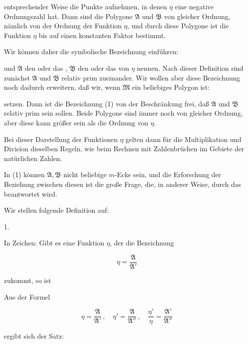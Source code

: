 entsprechender Weise die Punkte aufnehmen, in denen $\eta$ eine negative Ordnungszahl hat. Dann sind die Polygone $\mathfrak{A}$ und $\mathfrak{B}$ von gleicher Ordnung, nämlich von der Ordnung der Funktion $\eta$, und durch diese Polygone ist die Funktion $\eta$ bis auf einen konstanten Faktor bestimmt.

Wir können daher die symbolische Bezeichnung einführen:


und $\mathfrak{A}$ den  oder das , $\mathfrak{B}$ den  oder das  von $\eta$ nennen. Nach dieser Definition sind zunächst $\mathfrak{A}$ und $\mathfrak{B}$ relativ prim zueinander. Wir wollen aber diese Bezeichnung noch dadurch erweitern, daß wir, wenn $\mathfrak{M}$ ein beliebiges Polygon ist:


setzen. Dann ist die Bezeichnung (1) von der Beschränkung frei, daß $\mathfrak{A}$ und $\mathfrak{B}$ relativ prim sein sollen. Beide Polygone sind immer noch von gleicher Ordnung, aber diese kann größer sein als die Ordnung von $\eta$.

Bei dieser Darstellung der Funktionen $\eta$ gelten dann für die Multiplikation und Division dieselben Regeln, wie beim Rechnen mit Zahlenbrüchen im Gebiete der natürlichen Zahlen.

In (1) können $\mathfrak{A}, \mathfrak{B}$ nicht beliebige $m$-Ecke sein, und die Erforschung der Beziehung zwischen diesen ist die große Frage, die, in anderer Weise, durch das  beantwortet wird.

Wir stellen folgende Definition auf:

1. 

In Zeichen: Gibt es eine Funktion $\eta$, der die Bezeichnung

\[
\eta = \dfrac{\mathfrak{A}}{\mathfrak{A}'}
\]

zukommt, so ist


Aus der Formel

\[
\eta = \dfrac{\mathfrak{A}}{\mathfrak{A}'}\,, \quad \eta' = \dfrac{\mathfrak{A}}{\mathfrak{A}''}\,, \quad \dfrac{\eta'}{\eta} = \dfrac{\mathfrak{A}'}{\mathfrak{A}''}
\]

ergibt sich der Satz:
